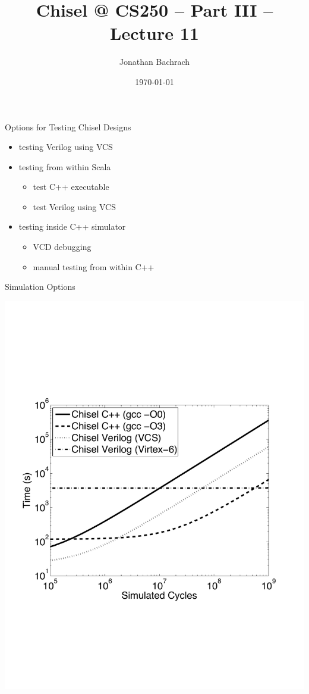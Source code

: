\documentclass[xcolor=pdflatex,dvipsnames,table]{beamer}
\title{Chisel @ CS250 -- Part III -- Lecture 11}
\author{Jonathan Bachrach}
\date{\today}
\institute[UC Berkeley]{EECS UC Berkeley}
\begin{document}
\begin{frame}
\titlepage
\end{frame}
\addtocounter{framenumber}{-1}

\begin{frame}{Options for Testing Chisel Designs}
\begin{itemize}
\item testing Verilog using VCS
\item testing from within Scala
\begin{itemize}
\item test C++ executable
\item test Verilog using VCS
\end{itemize}
\item testing inside C++ simulator
\begin{itemize}
\item VCD debugging
\item manual testing from within C++
\end{itemize}
\end{itemize}
\end{frame}

\begin{frame}{Simulation Options}
\begin{center}
\includegraphics[height=0.9\textheight]{../talks/dac12/figs/perf.pdf}
\end{center}
\end{frame}
\end{document}
